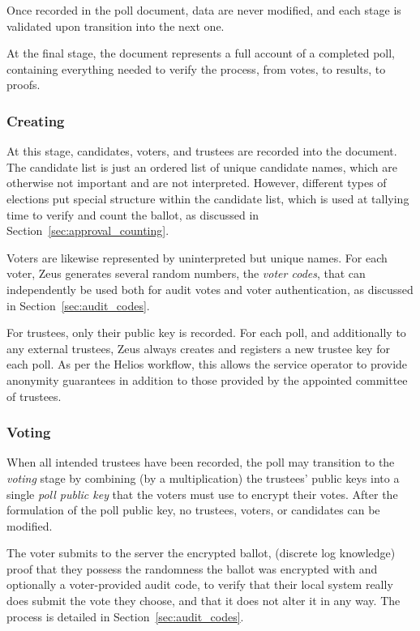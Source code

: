 \documentclass[letterpaper,10pt]{article}
\begin{document}
Once recorded in the poll document, data are never modified,
and each stage is validated upon transition into the next one.

At the final stage,
the document represents a full account of a completed poll,
containing everything needed to verify the process,
from votes, to results, to proofs.

\subsubsection{Creating}
\label{sec:creating}

At this stage, candidates, voters, and trustees
are recorded into the document.
The candidate list is just an ordered list of unique candidate names,
which are otherwise not important and are not interpreted.
However, different types of elections put special structure
within the candidate list, which is used at tallying time
to verify and count the ballot,
as discussed in Section~\ref{sec:approval_counting}.

Voters are likewise represented by uninterpreted but unique names.
For each voter,
Zeus generates several random numbers, the \emph{voter codes}, that can
independently be used both for audit votes and voter authentication,
as discussed in Section~\ref{sec:audit_codes}.

For trustees, only their public key is recorded.
For each poll, and additionally to any external trustees,
Zeus always creates and registers a new trustee key for each poll.
As per the Helios workflow, this allows the service operator to
provide anonymity guarantees in addition to those provided by
the appointed committee of trustees.

\subsubsection{Voting}
\label{sec:voting}
When all intended trustees have been recorded,
the poll may transition to the \emph{voting} stage
by combining (by a multiplication)
the trustees' public keys into a single \emph{poll public key}
that the voters must use to encrypt their votes.
After the formulation of the poll public key,
no trustees, voters, or candidates can be modified.

The voter submits to the server the encrypted ballot, (discrete
log knowledge) proof that they possess the randomness the ballot was
encrypted with and optionally a voter-provided audit code, to verify
that their local system really does submit the vote they choose,
and that it does not alter it in any way.
The process is detailed in Section~\ref{sec:audit_codes}.
\end{document}
